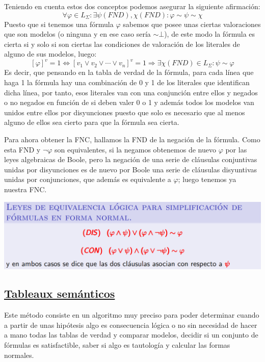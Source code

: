 \documentclass[10pt,a4paper,openright]{book}
\begin{document}
Teniendo en cuenta estos dos conceptos podemos asegurar la siguiente afirmación:
$$\forall \varphi \in L_\Sigma: \exists \psi (FND), \chi(FND): \varphi \sim \psi \sim \chi$$
Puesto que si tenemos una fórmula $\varphi$ sabemos que posee unas ciertas valoraciones que son modelos (o ninguna y en ese caso sería $\sim \bot$), de este modo la fórmula es cierta si y solo si son ciertas las condiciones de valoración de los literales de alguno de sus modelos, luego:
$$[\varphi]^v = 1\Leftrightarrow [v_1 \vee v_2 \vee \cdots \vee v_n]^v = 1\Rightarrow \exists \chi (FND)\in L_\Sigma : \psi \sim \varphi$$
Es decir, que pensando en la tabla de verdad de la fórmula, para cada línea que haga 1 la fórmula hay una combinación de 0 y 1 de los literales que identifican dicha línea, por tanto, esos literales van con una conjunción entre ellos y negados o no negados en función de si deben valer 0 o 1 y además todos los modelos van unidos entre ellos por disyunciones puesto que solo es necesario que al menos alguno de ellos sea cierto para que la fórmula sea cierta.

Para ahora obtener la FNC, hallamos la FND de la negación de la fórmula. Como esta FND y $\neg \varphi$ son equivalentes, si la negamos obtenemos de nuevo $\varphi$ por las leyes algebraicas de Boole, pero la negación de una serie de cláusulas conjuntivas unidas por disyunciones es de nuevo por Boole una serie de cláusulas disyuntivas unidas por conjunciones, que además es equivalente a $\varphi$; luego tenemos ya nuestra FNC.

\begin{center}
\includegraphics[scale=0.5]{simplificar FND}
\end{center}

\subsection*{\underline{Tableaux semánticos}}
Este método consiste en un algoritmo muy preciso para poder determinar cuando a partir de unas hipótesis algo es consecuencia lógica o no sin necesidad de hacer a mano todas las tablas de verdad y comparar modelos, decidir si un conjunto de fórmulas es satisfactible, saber si algo es tautología y calcular las formas normales.
\end{document}
